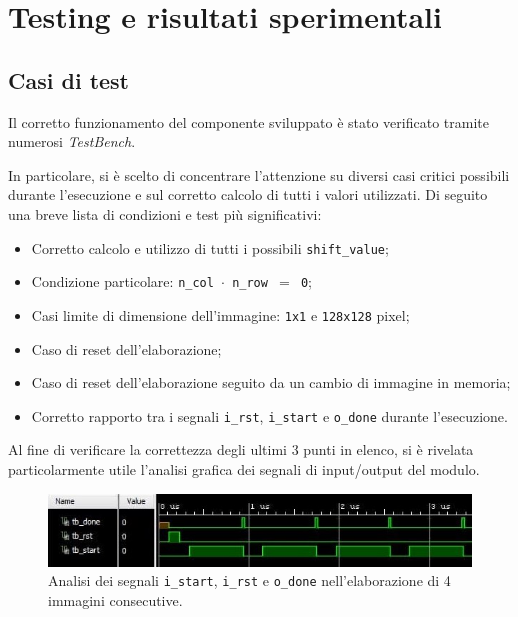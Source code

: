 \documentclass{article}
\begin{document}
\section{Testing e risultati sperimentali} %
\subsection{Casi di test} %
Il corretto funzionamento del componente sviluppato è stato verificato tramite numerosi \emph{TestBench}.\par In particolare, si è scelto di concentrare l’attenzione su diversi casi critici possibili durante l’esecuzione e sul corretto calcolo di tutti i valori utilizzati. Di seguito una breve lista di condizioni e test più significativi:

\begin{itemize}
    \item   Corretto calcolo e utilizzo di tutti i possibili \texttt{shift\_value};
    \item   Condizione particolare: \texttt{n\_col $\cdot$ n\_row $=$ 0}\footnotemark ;
    \item   Casi limite di dimensione dell’immagine: \texttt{1x1} e \texttt{128x128} pixel;
    \item   Caso di reset dell’elaborazione;
    \item   Caso di reset dell’elaborazione seguito da un cambio di immagine in memoria;
    \item   Corretto rapporto tra i segnali \texttt{i\_rst}, \texttt{i\_start} e \texttt{o\_done} durante   l’esecuzione.
\end{itemize}

Al fine di verificare la correttezza degli ultimi 3 punti in elenco, si è rivelata particolarmente utile l'analisi grafica dei segnali di input/output del modulo.
\vspace{0,2cm}

\begin{figure}[ht]
    \centering
    \includegraphics[scale=0.9]{./images/segnaliSignificativi.jpg}
    \caption{Analisi dei segnali \texttt{i\_start}, \texttt{i\_rst} e \texttt{o\_done} nell'elaborazione di 4 immagini consecutive.}
\end{figure}
\vspace{0,2cm}
\end{document}
